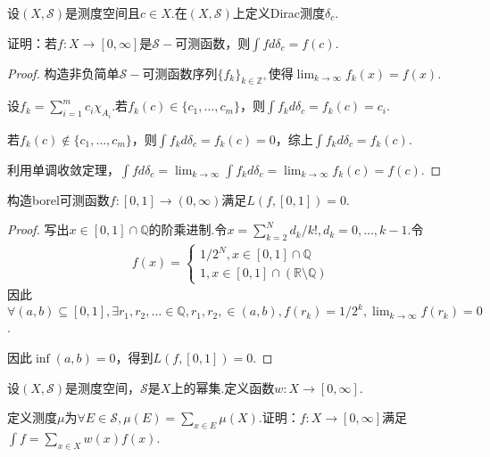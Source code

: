 \begin{problem}[2]\label{3.A.2}
    设\((X, \mathcal{S})\)是测度空间且\(c \in X\).在\((X, \mathcal{S})\)上定义Dirac测度\(\delta_c\).

    证明：若\(f: X \to [0,\infty]\)是\(\mathcal{S}-\)可测函数，则\(\int f d\delta_c=f(c)\).
\end{problem}

\begin{proof}
    构造非负简单\(\mathcal{S}-\)可测函数序列\(\{f_k\}_{k \in \mathbb{Z}^+}\)使得\(\lim_{k \to \infty}f_k(x)=f(x)\).

    设\(f_k=\sum_{i=1}^m c_i \chi_{A_i}\).若\(f_k(c) \in \{c_1, \dots, c_m\}\)，则\(\int f_k d\delta_c=f_k(c)=c_i\).

    若\(f_k(c) \notin \{c_1, \dots, c_m\}\)，则\(\int f_k d\delta_c=f_k(c)=0\)，综上\(\int f_k d\delta_c=f_k(c)\).

    利用单调收敛定理，\(\int f d\delta_c=\lim_{k \to \infty} \int f_k d\delta_c=\lim_{k \to \infty}f_k(c)=f(c)\).
\end{proof}

\begin{problem}[4]\label{3.A.4}
    构造borel可测函数\(f: [0,1] \to (0,\infty)\)满足\(L(f,[0,1])=0\).
\end{problem}

\begin{proof}
    写出\(x \in [0,1] \cap \mathbb{Q}\)的{\kaishu 阶乘进制}.令\(x=\sum_{k=2}^N d_k/k!, d_k=0, \dots, k-1\).令
    \begin{align*}
        f(x)=
        \begin{cases}
            1/2^N, x \in [0,1] \cap \mathbb{Q} \\
            1, x \in [0,1] \cap (\mathbb{R} \setminus \mathbb{Q})
        \end{cases}
    \end{align*}
    因此\(\forall (a,b) \subseteq [0,1], \exists r_1, r_2, \dots \in \mathbb{Q}, r_1, r_2, \in (a,b), f(r_k)=1/2^k, \lim_{k \to \infty}f(r_k)=0\).
    
    因此\(\inf(a,b)=0\)，得到\(L(f,[0,1])=0\).
\end{proof}

\newpage

\begin{problem}[7]\label{3.A.7}
    设\((X, \mathcal{S})\)是测度空间，\(\mathcal{S}\)是\(X\)上的幂集.定义函数\(w: X \to [0,\infty]\).

    定义测度\(\mu\)为\(\forall E \in \mathcal{S}, \mu(E)=\sum_{x \in E}\mu(X)\).证明：\(f: X \to [0,\infty]\)满足\(\int f=\sum_{x \in X}w(x)f(x)\).
\end{problem}

